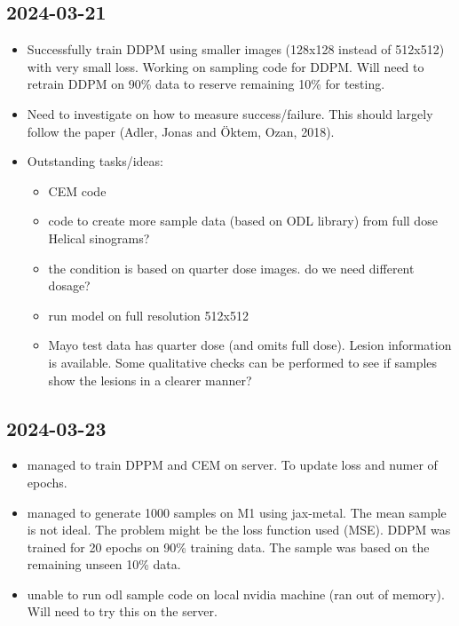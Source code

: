 \documentclass[a4paper, 11pt]{article}
\begin{document}
\subsection{2024-03-21}
\label{sec:orgbc43217}
\begin{itemize}
\item Successfully train DDPM using smaller images (128x128 instead of 512x512) with very small loss. Working on sampling code for DDPM. Will need to retrain DDPM on 90\% data to reserve remaining 10\% for testing.
\item Need to investigate on how to measure success/failure. This should largely follow the paper (Adler, Jonas and Öktem, Ozan, 2018).
\item Outstanding tasks/ideas:
\begin{itemize}
\item CEM code
\item code to create more sample data (based on ODL library) from full dose Helical sinograms?
\item the condition is based on quarter dose images. do we need different dosage?
\item run model on full resolution 512x512
\item Mayo test data has quarter dose (and omits full dose). Lesion information is available. Some qualitative checks can be performed to see if samples show the lesions in a clearer manner?
\end{itemize}
\end{itemize}
\subsection{2024-03-23}
\label{sec:orgc1baab9}
\begin{itemize}
\item managed to train DPPM and CEM on server. To update loss and numer of epochs.
\item managed to generate 1000 samples on M1 using jax-metal. The mean sample is not ideal. The problem might be the loss function used (MSE). DDPM was trained for 20 epochs on 90\% training data. The sample was based on the remaining unseen 10\% data.
\item unable to run odl sample code on local nvidia machine (ran out of memory). Will need to try this on the server.
\end{itemize}
\end{document}
